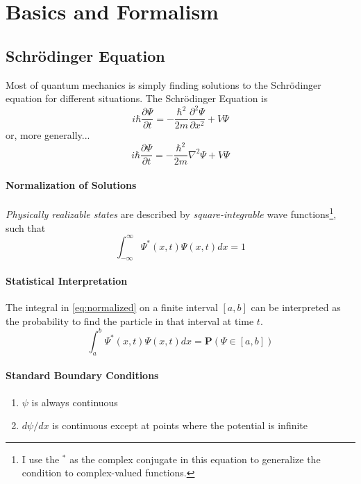 \chapter{Basics and Formalism}



\section{Schr{\"o}dinger Equation}
Most of quantum mechanics is simply finding solutions to the Schr{\"o}dinger equation for different situations. The Schr{\"o}dinger Equation is
\begin{equation} \label{eq:schro-general}
    i \hbar \dfrac{\partial\Psi}{\partial t} = - \frac{\hbar^2}{2m} \frac{\partial^2 \Psi}{\partial x^2} + V\Psi
\end{equation}
or, more generally...
\begin{equation} \label{eq:schro-general}
    i \hbar \dfrac{\partial\Psi}{\partial t} = - \frac{\hbar^2}{2m} \nabla^2\Psi + V\Psi
\end{equation}
\subsubsection{Normalization of Solutions}
\textit{Physically realizable states} are described by \textit{square-integrable} wave functions\footnote{I use the $^*$ as the complex conjugate in this equation to generalize the condition to complex-valued functions.}, such that
\begin{equation} \label{eq:normalized}
    \int_{-\infty}^{\infty} \Psi^*(x,t) \Psi(x,t) dx = 1
\end{equation}
\subsubsection{Statistical Interpretation}
The integral in \ref{eq:normalized} on a finite interval $[a,b]$ can be interpreted as the probability to find the particle in that interval at time $t$.
\begin{equation} \label{eq:normalized}
    \int_{a}^{b} \Psi^*(x,t) \Psi(x,t) dx = \mathbf{P}(\Psi \in [a,b])
\end{equation}

\subsubsection{Standard Boundary Conditions}
\begin{enumerate}
    \item $\psi$ is always continuous
    \item $d\psi/dx$ is continuous except at points where the potential is infinite
\end{enumerate}

